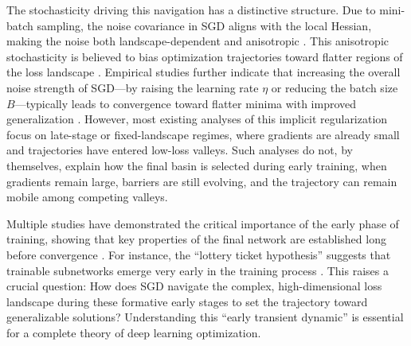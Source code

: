 \documentclass[aps,prx,reprint,superscriptaddress,longbibliography,nofootinbib,floatfix]{revtex4-2}
\begin{document}
The stochasticity driving this navigation has a distinctive structure. Due to mini-batch sampling, the noise covariance in SGD aligns with the local Hessian, making the noise both landscape-dependent and anisotropic \cite{zhuAnisotropicNoiseStochastic2019,xieDiffusionTheoryDeep2021,weiHowNoiseAffects2019,yangStochasticGradientDescent2023,xieOverlookedStructureStochastic2023,haochenShapeMattersUnderstanding2021,zhangSuperlinearRelationshipSGD2026}. This anisotropic stochasticity is believed to bias optimization trajectories toward flatter regions of the loss landscape \cite{xieDiffusionTheoryDeep2021,zhuAnisotropicNoiseStochastic2019,yangStochasticGradientDescent2023}. Empirical studies further indicate that increasing the overall noise strength of SGD---by raising the learning rate $\eta$ or reducing the batch size $B$---typically leads to convergence toward flatter minima with improved generalization \cite{keskarLargeBatchTrainingDeep2017,chaudhariEntropySGDBiasingGradient2019,jastrzebskiThreeFactorsInfluencing2018}. However, most existing analyses of this implicit regularization focus on late-stage or fixed-landscape regimes, where gradients are already small and trajectories have entered low-loss valleys. Such analyses do not, by themselves, explain how the final basin is selected during early training, when gradients remain large, barriers are still evolving, and the trajectory can remain mobile among competing valleys.

Multiple studies have demonstrated the critical importance of the early phase of training, showing that key properties of the final network are established long before convergence \cite{gur-ariGradientDescentHappens2018,achilleCriticalLearningPeriods2019,fengPhasesLearningDynamics2021a,kalraPhaseDiagramEarly2023,jastrzebskiBreakEvenPointOptimization2020}. For instance, the ``lottery ticket hypothesis'' suggests that trainable subnetworks emerge very early in the training process \cite{frankleLotteryTicketHypothesis2019}. This raises a crucial question: How does SGD navigate the complex, high-dimensional loss landscape during these formative early stages to set the trajectory toward generalizable solutions? Understanding this ``early transient dynamic'' is essential for a complete theory of deep learning optimization.

\end{document}
